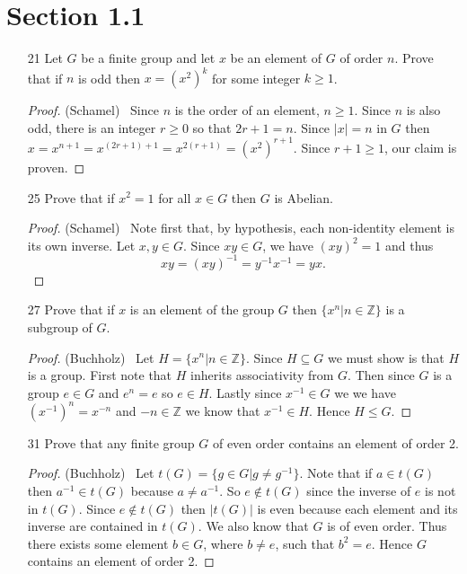 \documentclass[10pt]{article}
\newcommand{\Z}{\mathbb{Z}}
\begin{document}
\section*{Section 1.1}

\begin{itemize}


\item[21] Let $G$ be a finite group and let $x$ be an element of $G$ of order $n$.  Prove that if $n$ is odd then $x = (x^2)^k$ for some integer $k \geq 1$.

\begin{proof}(Schamel) \ Since $n$ is the order of an element, $n \geq 1$.  Since $n$ is also odd, there is an integer $r \geq 0$ so that $2r +1 = n$.  Since $|x| =n$ in $G$ then $x = x^{n+1} = x^{(2r+1)+1} = x^{2(r+1)} = (x^2)^{r+1}$.  Since $r+1 \geq 1$, our claim is proven.
\end{proof}

\item[25] Prove that if $x^2 = 1$ for all $x \in G$ then $G$ is Abelian.

\begin{proof}(Schamel) \ Note first that, by hypothesis, each non-identity
element is its own inverse.  Let $x,y \in G$.  Since $xy \in G$, we have $(xy)^2 = 1$ and thus
\[ xy = (xy)^{-1} = y^{-1}x^{-1} = yx. \]
\end{proof}

\item[27]  Prove that if $x$ is an element of the group $G$ then $\{x^n|n\in \Z\}$ is a subgroup of $G$.

\begin{proof}(Buchholz) \ Let $H=\{x^n|n\in \Z\}$.  Since $H\subseteq G$ we must show is that $H$ is a group.  First note that $H$ inherits associativity from $G$.  Then since $G$ is a group $e\in G$ and $e^n=e$ so $e\in H$.  Lastly since $x^{-1}\in G$ we we have $(x^{-1})^n=x^{-n}$ and $-n\in \Z$ we know that $x^{-1}\in H$.  Hence $H\leq G.$

\end{proof}


\item[31]  Prove that any finite group $G$ of even order contains an element of order 2.

\begin{proof}(Buchholz) \ Let $t(G)=\{g\in G| g\neq g^{-1}\}$.  Note that if $a\in t(G)$ then $a^{-1}\in t(G)$ because $a\neq a^{-1}$.  So $e\notin t(G)$ since the inverse of $e$ is not in $t(G)$.  Since $e\notin t(G)$ then $|t(G)|$ is even because each element and its inverse are contained in $t(G)$.  We also know that $G$ is of even order.  Thus there exists some element $b\in G$, where $b\neq e$, such that $b^2=e$.  Hence $G$ contains an element of order 2.

\end{proof}


\end{itemize}
\end{document}
